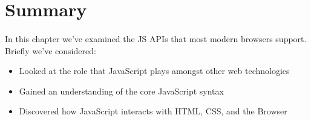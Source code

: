 \section{Summary}
\paragraph{} In this chapter we've examined the JS APIs that most modern browsers support. Briefly we've considered:
\begin{itemize}
\item Looked at the role that JavaScript plays amongst other web technologies
\item Gained an understanding of the core JavaScript syntax
\item Discovered how JavaScript interacts with HTML, CSS, and the Browser
\end{itemize}

